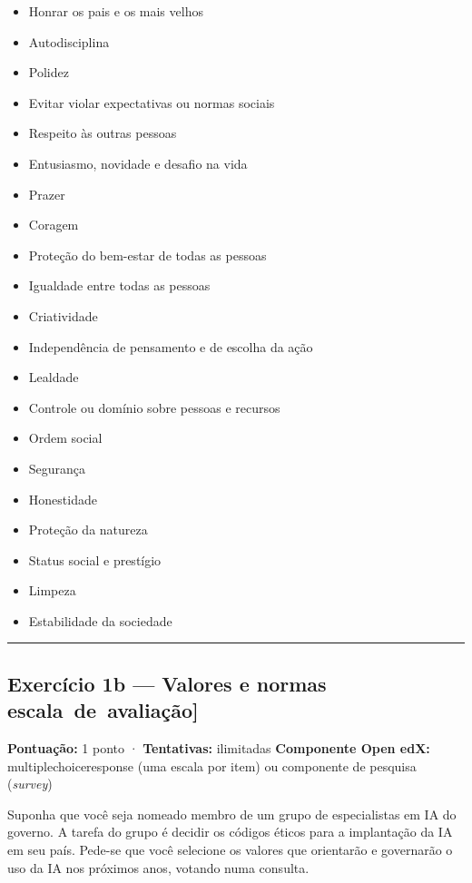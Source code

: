 \documentclass[
  11pt,
]{article}
\providecommand{\tightlist}{%
  \setlength{\itemsep}{0pt}\setlength{\parskip}{0pt}}
\renewcommand{\texttt}[1]{{\color{iaAmeixa}\small\ttfamily #1}}
\begin{document}
\begin{itemize}
\tightlist
\item
  Honrar os pais e os mais velhos
\item
  Autodisciplina
\item
  Polidez
\item
  Evitar violar expectativas ou normas sociais
\item
  Respeito às outras pessoas
\item
  Entusiasmo, novidade e desafio na vida
\item
  Prazer
\item
  Coragem
\item
  Proteção do bem-estar de todas as pessoas
\item
  Igualdade entre todas as pessoas
\item
  Criatividade
\item
  Independência de pensamento e de escolha da ação
\item
  Lealdade
\item
  Controle ou domínio sobre pessoas e recursos
\item
  Ordem social
\item
  Segurança
\item
  Honestidade
\item
  Proteção da natureza
\item
  Status social e prestígio
\item
  Limpeza
\item
  Estabilidade da sociedade
\end{itemize}

\begin{center}\rule{0.5\linewidth}{0.5pt}\end{center}

\hypertarget{exercuxedcio-1b-valores-e-normas-escala-de-avaliauxe7uxe3o}{%
\subsection{\texorpdfstring{Exercício 1b --- Valores e normas
\texttt{{[}escala\ de\ avaliação{]}}}{Exercício 1b --- Valores e normas {[}escala de avaliação{]}}}\label{exercuxedcio-1b-valores-e-normas-escala-de-avaliauxe7uxe3o}}

\textbf{Pontuação:} 1 ponto · \textbf{Tentativas:} ilimitadas
\textbf{Componente Open edX:} \texttt{multiplechoiceresponse} (uma
escala por item) ou componente de pesquisa (\emph{survey})

Suponha que você seja nomeado membro de um grupo de especialistas em IA
do governo. A tarefa do grupo é decidir os códigos éticos para a
implantação da IA em seu país. Pede-se que você selecione os valores que
orientarão e governarão o uso da IA nos próximos anos, votando numa
consulta.
\end{document}
